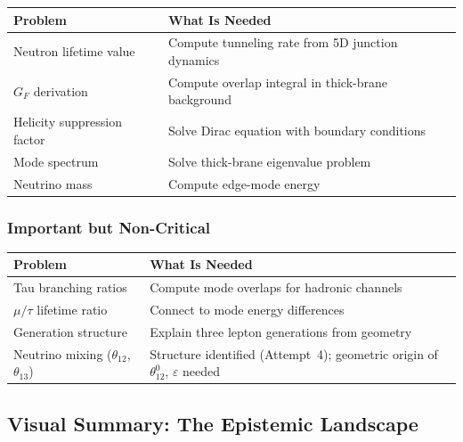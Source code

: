 \begin{center}
\begin{tabular}{p{5cm}p{8cm}}
\toprule
\textbf{Problem} & \textbf{What Is Needed} \\
\midrule
Neutron lifetime value & Compute tunneling rate from 5D junction dynamics \\
$G_F$ derivation & Compute overlap integral in thick-brane background \\
Helicity suppression factor & Solve Dirac equation with boundary conditions \\
Mode spectrum & Solve thick-brane eigenvalue problem \\
Neutrino mass & Compute edge-mode energy \\
\bottomrule
\end{tabular}
\end{center}

\subsubsection{Important but Non-Critical}

\begin{center}
\begin{tabular}{p{5cm}p{8cm}}
\toprule
\textbf{Problem} & \textbf{What Is Needed} \\
\midrule
Tau branching ratios & Compute mode overlaps for hadronic channels \\
$\mu/\tau$ lifetime ratio & Connect to mode energy differences \\
Generation structure & Explain three lepton generations from geometry \\
Neutrino mixing ($\theta_{12}$, $\theta_{13}$) & Structure identified (Attempt~4); geometric origin of $\theta_{12}^0$, $\varepsilon$ needed \\
\bottomrule
\end{tabular}
\end{center}

\subsection{Visual Summary: The Epistemic Landscape}

